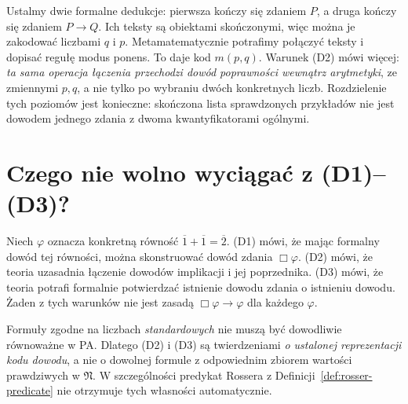 \begin{przyklad}
Ustalmy dwie formalne dedukcje: pierwsza kończy się zdaniem $P$,
a druga kończy się zdaniem $P\to Q$. Ich teksty są obiektami
skończonymi, więc można je zakodować liczbami $q$ i $p$.
Metamatematycznie potrafimy połączyć teksty i dopisać regułę
modus ponens. To daje kod $m(p,q)$. Warunek (D2) mówi więcej:
\emph{ta sama operacja łączenia przechodzi dowód poprawności
wewnątrz arytmetyki}, ze zmiennymi $p,q$, a nie tylko po
wybraniu dwóch konkretnych liczb. Rozdzielenie tych poziomów
jest konieczne: skończona lista sprawdzonych przykładów nie
jest dowodem jednego zdania z dwoma kwantyfikatorami ogólnymi.
\end{przyklad}

\section{Czego nie wolno wyciągać z (D1)--(D3)?}
\begin{przyklad}
Niech $\varphi$ oznacza konkretną równość
$\overline1+\overline1=\overline2$.
(D1) mówi, że mając formalny dowód tej równości,
można skonstruować dowód zdania $\Box\varphi$.
(D2) mówi, że teoria uzasadnia łączenie dowodów
implikacji i jej poprzednika. (D3) mówi,
że teoria potrafi formalnie potwierdzać istnienie
dowodu zdania o istnieniu dowodu.
Żaden z tych warunków nie jest zasadą
$\Box\varphi\to\varphi$ dla każdego $\varphi$.
\end{przyklad}

\begin{uwaga}
Formuły zgodne na liczbach \emph{standardowych}
nie muszą być dowodliwie równoważne w PA.
Dlatego (D2) i (D3) są twierdzeniami
\emph{o ustalonej reprezentacji kodu dowodu},
a nie o dowolnej formule z odpowiednim zbiorem
wartości prawdziwych w $\mathfrak N$.
W szczególności predykat Rossera z
Definicji~\ref{def:rosser-predicate} nie otrzymuje
tych własności automatycznie.
\end{uwaga}